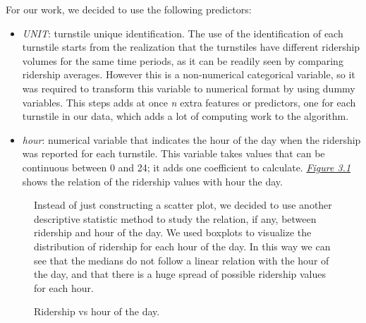 \documentclass[letterpaper,10pt,english]{sphinxmanual}
\begin{document}
For our work, we decided to use the following predictors:
\begin{itemize}
\item {} 
\emph{UNIT}: turnstile unique identification. The use of the identification
of each turnstile starts from the realization that the turnstiles have different
ridership volumes for the same time periods, as it can be readily seen by
comparing ridership averages. However this is a non-numerical categorical
variable, so it was required to transform this variable to numerical format
by using dummy variables. This steps adds at once \emph{n} extra features or predictors,
one for each turnstile in our data, which adds a lot of computing work to the
algorithm.

\item {} 
\emph{hour}: numerical variable that indicates the hour of the day when the ridership
was reported for each turnstile. This variable takes values that can be continuous
between 0 and 24; it adds one coefficient to calculate. {\hyperref[section2:figure31]{\emph{Figure 3.1}}}
shows the relation of the ridership values with hour the day.

\end{itemize}
\begin{figure}[htbp]
\centering
\capstart

\caption{Ridership vs hour of the day.}{\small 
Instead of just constructing a scatter plot, we decided to use another descriptive
statistic method to study the relation, if any, between ridership and hour of
the day. We used boxplots to visualize the distribution of ridership for each
hour of the day. In this way we can see that the medians do not follow a
linear relation with the hour of the day, and that there is a huge spread
of possible ridership values for each hour.
}\label{section2:figure31}\end{figure}
\end{document}
